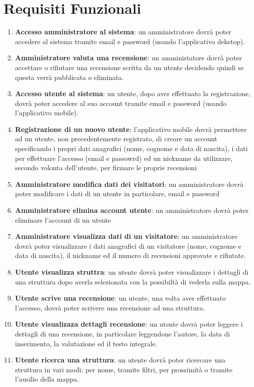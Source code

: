 \section{Requisiti Funzionali}
\begin{enumerate}
    \item  \textbf{Accesso amministratore al sistema}: un amministratore dovrà poter accedere al sistema tramite email e password (usando l'applicativo dekstop).
    \item  \textbf{Amministratore valuta una recensione}: un amministatore dovrà poter accettare o rifiutare una recensione scritta da un utente decidendo quindi se questa verrà pubblicata o eliminata.
    \item \textbf{Accesso utente al sistema}: un utente, dopo aver effettuato la registrazione, dovrà poter accedere al suo account tramite email e password (usando l'applicativo mobile). 
    \item  \textbf{Registrazione di un nuovo utente}: l'applicativo mobile dovrà permettere ad un utente, non precedentemente registrato, di creare un account specificando 
    i propri dati anagrafici (nome, cognome e data di nascita), i dati per effettuare l'accesso (email e passowrd) ed un nickname da utilizzare, secondo volonta dell'utente, per firmare  
    le proprie recensioni
    \item \textbf{Amministratore modifica dati dei visitatori}: un amministratore dovrà poter modificare i dati di un utente in particolare, email e password
    \item \textbf{Amministratore elimina account utente}: un amministratore dovrà poter eliminare l'account di un utente
    \item \textbf{Amministratore visualizza dati di un visitatore}: un amministratore dovrà poter visualizzare i dati anagrafici di un visitatore (nome, cognome e data di nascita), 
    il nickname ed il numero di recensioni approvate e rifiutate.
    \item \textbf{Utente visualizza struttra}: un utente dovrà poter visualizzare i dettagli di una struttura dopo averla selezionata con la possibiltà di vederla sulla mappa.
    \item \textbf{Utente scrive una recensione}: un utente, una volta aver effettuato l'accesso, dovrà poter scrivere una recensione ad una struttura.
    \item \textbf{Utente visualizaza dettagli recensione}: un utente dovrà poter leggere i dettagli di una recensione, in particolare leggendone l'autore, la data di inserimento, la valutazione
    ed il testo integrale.
    \item \textbf{Utente ricerca una struttura}: un utente dovrà poter ricercare una struttura in vari modi: per nome, tramite filtri, per prossimità o tramite l'ausilio della mappa.
\end{enumerate}
